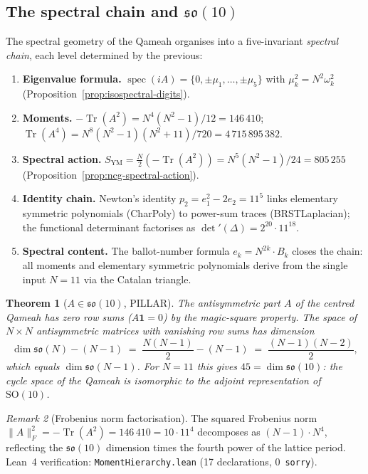 \documentclass[aps,prd,twocolumn,superscriptaddress,floatfix,nofootinbib]{revtex4-2}
\newtheorem{theorem}{Theorem}
\theoremstyle{definition}
\theoremstyle{remark}
\newtheorem{remark}[theorem]{Remark}
\begin{document}
\subsection{The spectral chain and \texorpdfstring{$\mathfrak{so}(10)$}{so(10)}}
\label{sec:spectral-chain-so10}

The spectral geometry of the Qameah organises into a five-invariant
\emph{spectral chain}, each level determined by the previous:
\begin{enumerate}
\item \textbf{Eigenvalue formula.}
  $\operatorname{spec}(iA) = \{0,\pm\mu_1,\ldots,\pm\mu_5\}$
  with $\mu_k^2 = N^2\omega_k^2$ (Proposition~\ref{prop:isospectral-digits}).
\item \textbf{Moments.}
  $-\operatorname{Tr}(A^2) = N^4(N^2{-}1)/12 = 146\,410$;
  $\operatorname{Tr}(A^4) = N^8(N^2{-}1)(N^2{+}11)/720 = 4\,715\,895\,382$.
\item \textbf{Spectral action.}
  $S_{\mathrm{YM}} = \tfrac{N}{2}(-\operatorname{Tr}(A^2))
   = N^5(N^2{-}1)/24 = 805\,255$
  (Proposition~\ref{prop:ncg-spectral-action}).
\item \textbf{Identity chain.}
  Newton's identity $p_2 = e_1^2 - 2e_2 = 11^5$ links
  elementary symmetric polynomials (CharPoly) to power-sum traces
  (BRSTLaplacian); the functional determinant factorises as
  $\det'(\Delta) = 2^{20}\cdot 11^{18}$.
\item \textbf{Spectral content.}
  The ballot-number formula $e_k = N^{2k}\cdot B_k$
  closes the chain: all moments and elementary symmetric polynomials
  derive from the single input $N = 11$ via the Catalan triangle.
\end{enumerate}

\begin{theorem}[$A \in \mathfrak{so}(10)$, PILLAR]
\label{thm:A-in-so10}
The antisymmetric part $A$ of the centred Qameah has zero row sums
($A\mathbf{1} = 0$) by the magic-square property.  The space of
$N{\times}N$ antisymmetric matrices with vanishing row sums has
dimension
\[
  \dim\mathfrak{so}(N) - (N{-}1) \;=\;
  \frac{N(N{-}1)}{2} - (N{-}1) \;=\;
  \frac{(N{-}1)(N{-}2)}{2},
\]
which equals $\dim\mathfrak{so}(N{-}1)$.
For $N=11$ this gives $45 = \dim\mathfrak{so}(10)$:
the cycle space of the Qameah is isomorphic to the adjoint
representation of $\mathrm{SO}(10)$.
\end{theorem}

\begin{remark}[Frobenius norm factorisation]
\label{rem:frobenius-norm}
The squared Frobenius norm
$\|A\|_F^2 = -\operatorname{Tr}(A^2) = 146\,410 = 10\cdot 11^4$
decomposes as $(N{-}1)\cdot N^4$, reflecting the $\mathfrak{so}(10)$
dimension times the fourth power of the lattice period.
Lean~4 verification: \texttt{MomentHierarchy.lean} (17 declarations,
0~\texttt{sorry}).
\end{remark}
\end{document}
